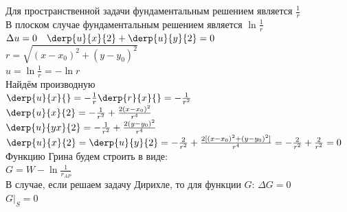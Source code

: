 Для пространственной задачи фундаментальным решением является $\frac{1}{r}$\\
В плоском случае фундаментальным решением является $\ln \frac{1}{r}$\\
$\Delta u = 0 \quad \derp{u}{x}{2} + \derp{u}{y}{2} = 0$\\
$r = \sqrt{(x - x_0)^2 + (y - y_0)^2}$\\
$u = \ln \frac{1}{r} = - \ln r$\\
Найдём производную\\
$\derp{u}{x}{} = - \frac{1}{r} \derp{r}{x}{} = - \frac{1}{r^2}$\\
$\derp{u}{x}{2} = - \frac{1}{r^2} + \frac{2 (x - x_0)^2}{r^4}$\\
$\derp{u}{yx}{2} = - \frac{1}{r^2} + \frac{2 (y - y_0)^2}{r^4}$\\
$\derp{u}{x}{2} = \derp{u}{y}{2} = - \frac{2}{r^2} + \frac{2 [(x - x_0)^2 + (y - y_0)^2]}{r^4} = - \frac{2}{r^2} + \frac{2}{r^2} = 0$\\

Функцию Грина будем строить в  виде:\\
$G = W - \ln \frac{1}{r_{AP}}$\\
В случае, если решаем задачу Дирихле, то для функции $G$:
$\Delta G = 0$\\
$G|_S = 0$\\

